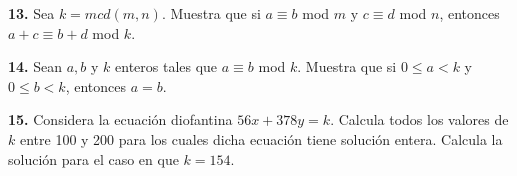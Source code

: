 \documentclass[12pt]{article}
\begin{document}
\vspace{1cm}
%
%
\textbf{13.} Sea $k = mcd(m, n)$. Muestra que si $a \equiv b$ mod $m$ y $c \equiv d$ mod $n$, entonces $a + c \equiv b + d$ mod $k$.

\vspace{1cm}
%
%
\textbf{14.} Sean $a, b$ y $k$ enteros tales que $a \equiv b$ mod $k$. Muestra que si $0 \leq a < k$ y $0 \leq b < k$, entonces $a = b$.

\vspace{1cm}
%
%
\textbf{15.} Considera la ecuación diofantina $56x + 378y= k$. Calcula todos los valores de $k$ entre 100 y 200 para
los cuales dicha ecuación tiene solución entera. Calcula la solución para el caso en que $k = 154$.
\end{document}
